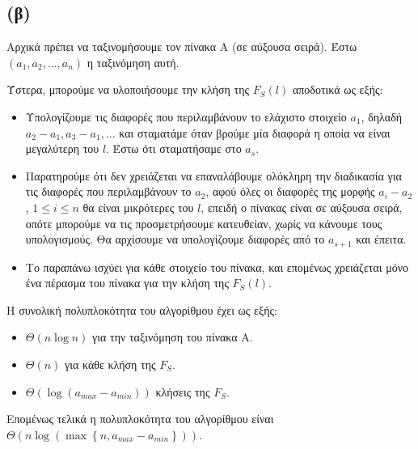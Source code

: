 		\subsection*{(β)}
		
			Αρχικά πρέπει να ταξινομήσουμε τον πίνακα Α (σε αύξουσα σειρά). Έστω $(a_1, a_2, ..., a_n)$ η ταξινόμηση αυτή.
			
			Ύστερα, μπορούμε να υλοποιήσουμε την κλήση της $F_S(l)$ αποδοτικά ως εξής: 
			
			\begin{itemize} 
				\item Υπολογίζουμε τις διαφορές που περιλαμβάνουν το ελάχιστο στοιχείο $a_1$, δηλαδή $a_2 - a_1, a_3 - a_1, ...$ και σταματάμε όταν βρούμε μία διαφορά η οποία να είναι μεγαλύτερη του $l$. Έστω ότι σταματήσαμε στο $a_s$.
				\item Παρατηρούμε ότι δεν χρειάζεται να επαναλάβουμε ολόκληρη την διαδικασία για τις διαφορές που περιλαμβάνουν το $a_2$, αφού όλες οι διαφορές της μορφής $a_i-a_2$, $1 \leq i \leq n$ θα είναι μικρότερες του $l$, επειδή ο πίνακας είναι σε αύξουσα σειρά, οπότε μπορούμε να τις προσμετρήσουμε κατευθείαν, χωρίς να κάνουμε τους υπολογισμούς. Θα αρχίσουμε να υπολογίζουμε διαφορές από το $a_{s+1}$ και έπειτα. 
				\item Το παραπάνω ισχύει για κάθε στοιχείο του πίνακα, και επομένως χρειάζεται μόνο ένα πέρασμα του πίνακα για την κλήση της $F_S(l)$.
			\end{itemize}
		
			Η συνολική πολυπλοκότητα του αλγορίθμου έχει ως εξής:
			
			\begin{itemize}
				\item $Θ(n \log n)$ για την ταξινόμηση του πίνακα A.
				\item $Θ(n)$ για κάθε κλήση της $F_S$.
				\item $Θ(\log (a_{max} - a_{min}))$ κλήσεις της $F_S$.
			\end{itemize}
		
			Επομένως τελικά η πολυπλοκότητα του αλγορίθμου είναι $Θ\left(n \log \left(\max \left\{n, a_{max}-a_{min}\right\}\right)\right)$.
			
			
